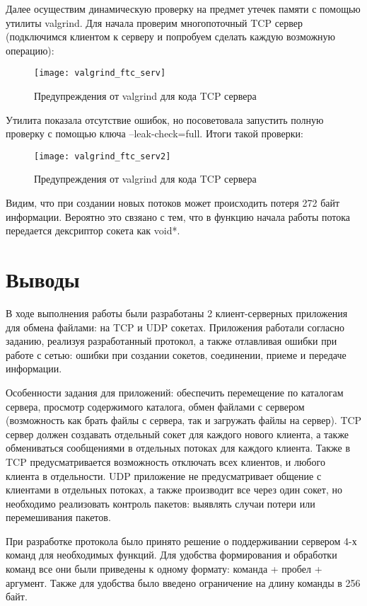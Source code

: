Далее осуществим динамическую проверку на предмет утечек памяти с помощью утилиты valgrind. Для начала проверим многопоточный TCP сервер (подключимся клиентом к серверу и попробуем сделать каждую возможную операцию):
\begin{figure}[H]
	\begin{center}
		\texttt{[image: valgrind\_ftc\_serv]}
		\caption{Предупреждения от valgrind для кода TCP сервера} 
		\label{pic:valgr1} %
	\end{center}
\end{figure}
Утилита показала отсутствие ошибок, но посоветовала запустить полную проверку с помощью ключа --leak-check=full. 
Итоги такой проверки:
\begin{figure}[H]
	\begin{center}
		\texttt{[image: valgrind\_ftc\_serv2]}
		\caption{Предупреждения от valgrind для кода TCP сервера} 
		\label{pic:valgr2} %
	\end{center}
\end{figure}
Видим, что при создании новых потоков может происходить потеря 272 байт информации. Вероятно это свзяано с тем, что в функцию начала работы потока передается дексриптор сокета как void*.

\section{Выводы}
В ходе выполнения работы были разработаны 2 клиент-серверных приложения для обмена файлами: на TCP и UDP сокетах. Приложения работали согласно заданию, реализуя разработанный протокол, а также отлавливая ошибки при работе с сетью: ошибки при создании сокетов, соединении, приеме и передаче информации. 

Особенности задания для приложений: обеспечить перемещение по каталогам сервера, просмотр содержимого каталога, обмен файлами с сервером (возможность как брать файлы с сервера, так и загружать файлы на сервер). 
TCP сервер должен создавать отдельный сокет для каждого нового клиента, а также обмениваться сообщениями в отдельных потоках для каждого клиента. Также в TCP предусматривается возможность отключать всех клиентов, и любого клиента в отдельности.
UDP приложение не предусматривает общение с клиентами  в отдельных потоках, а также производит все через один сокет, но необходимо реализовать контроль пакетов: выявлять случаи потери или перемешивания пакетов.

При разработке протокола было принято решение о поддерживании сервером 4-х команд для необходимых функций. Для удобства формирования и обработки команд все они были приведены к одному формату: команда + пробел + аргумент. Также для удобства было введено ограничение на длину команды в 256 байт.

